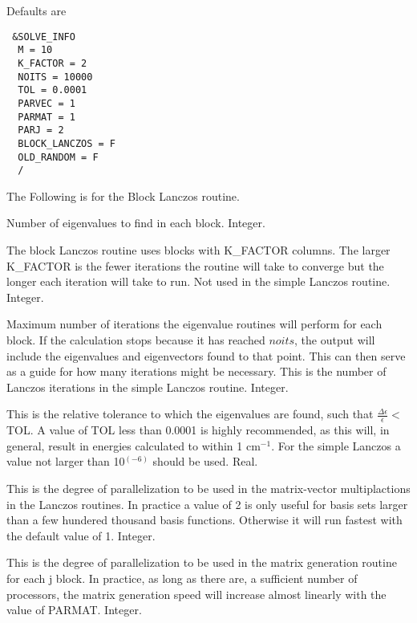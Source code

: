 \documentclass{article}
\newcommand{\wn}{cm$^{-1}$}
\begin{document}
Defaults are

\begin{verbatim}
 &SOLVE_INFO
  M = 10
  K_FACTOR = 2
  NOITS = 10000
  TOL = 0.0001
  PARVEC = 1
  PARMAT = 1
  PARJ = 2
  BLOCK_LANCZOS = F
  OLD_RANDOM = F
  /
\end{verbatim}

\begin{description}
\item The Following is for the Block Lanczos routine.

\item[M] Number of eigenvalues to find in each block. Integer.

\item[K\_FACTOR] The block Lanczos routine uses blocks with 
  K\_FACTOR columns. The larger K\_FACTOR is the fewer iterations
  the routine will take to converge but the longer each iteration
  will take to run. Not used in the simple Lanczos routine. Integer.

\item[NOITS] Maximum number of iterations the eigenvalue routines
  will perform for each block. If the calculation stops because it has
  reached $noits$, the output will include the eigenvalues and
  eigenvectors found to that point. This can then serve as a guide for
  how many iterations might be necessary. This is the number of Lanczos
  iterations in the simple Lanczos routine. Integer.

\item[TOL] This is the relative tolerance to which
  the eigenvalues are found, such that $\frac{\Delta \epsilon
    }{\epsilon } < $TOL. A value of TOL less than 0.0001 is highly
  recommended, as this will, in general, result in energies calculated
  to within 1 \wn . For the simple Lanczos a value not larger than 10$^(-6)$
  should be used. Real.
  
\item[PARVEC] This is the degree of parallelization to be used in
  the matrix-vector multiplactions in the Lanczos routines. In 
  practice a value of 2 is only useful for basis sets larger than
  a few hundered thousand basis functions. Otherwise it will run
  fastest with the default value of 1. Integer.

\item[PARMAT] This is the degree of parallelization to be used in
  the matrix generation routine for each j block. In practice, as long as there are,
  a sufficient number of processors, the matrix generation speed 
  will increase almost linearly with the value of PARMAT. Integer.


\end{description}
\end{document}
